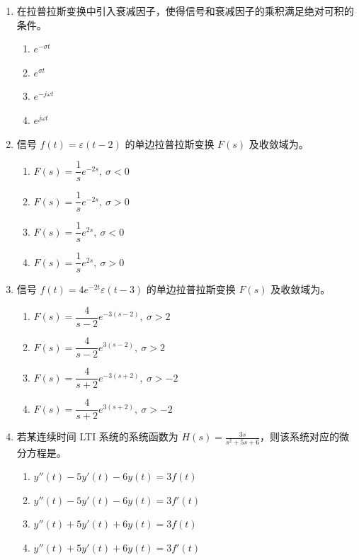 \documentclass[12pt,a4paper]{ctexart}
\newcommand{\eps}{\varepsilon}
\begin{document}
\begin{enumerate}[label=\arabic*.]
\item 在拉普拉斯变换中引入衰减因子\underline{\hspace{2cm}}，使得信号和衰减因子的乘积满足绝对可积的条件。
\begin{enumerate}[label=\Alph*.]
\item $e^{-\sigma t}$
\item $e^{\sigma t}$
\item $e^{-j\omega t}$
\item $e^{j\omega t}$
\end{enumerate}

\item 信号 $f(t)=\eps(t-2)$ 的单边拉普拉斯变换 $F(s)$ 及收敛域为\underline{\hspace{4cm}}。
\begin{enumerate}[label=\Alph*.]
\item $F(s)=\dfrac{1}{s}e^{-2s},\ \sigma<0$
\item $F(s)=\dfrac{1}{s}e^{-2s},\ \sigma>0$
\item $F(s)=\dfrac{1}{s}e^{2s},\ \sigma<0$
\item $F(s)=\dfrac{1}{s}e^{2s},\ \sigma>0$
\end{enumerate}

\item 信号 $f(t)=4e^{-2t}\eps(t-3)$ 的单边拉普拉斯变换 $F(s)$ 及收敛域为\underline{\hspace{4cm}}。
\begin{enumerate}[label=\Alph*.]
\item $F(s)=\dfrac{4}{s-2}e^{-3(s-2)},\ \sigma>2$
\item $F(s)=\dfrac{4}{s-2}e^{3(s-2)},\ \sigma>2$
\item $F(s)=\dfrac{4}{s+2}e^{-3(s+2)},\ \sigma>-2$
\item $F(s)=\dfrac{4}{s+2}e^{3(s+2)},\ \sigma>-2$
\end{enumerate}

\item 若某连续时间 LTI 系统的系统函数为 \(\displaystyle H(s)=\frac{3s}{s^2+5s+6}\)，则该系统对应的微分方程是\underline{\hspace{4cm}}。
\begin{enumerate}[label=\Alph*.]
\item $y''(t)-5y'(t)-6y(t)=3f(t)$
\item $y''(t)-5y'(t)-6y(t)=3f'(t)$
\item $y''(t)+5y'(t)+6y(t)=3f(t)$
\item $y''(t)+5y'(t)+6y(t)=3f'(t)$
\end{enumerate}


\end{enumerate}
\end{document}
